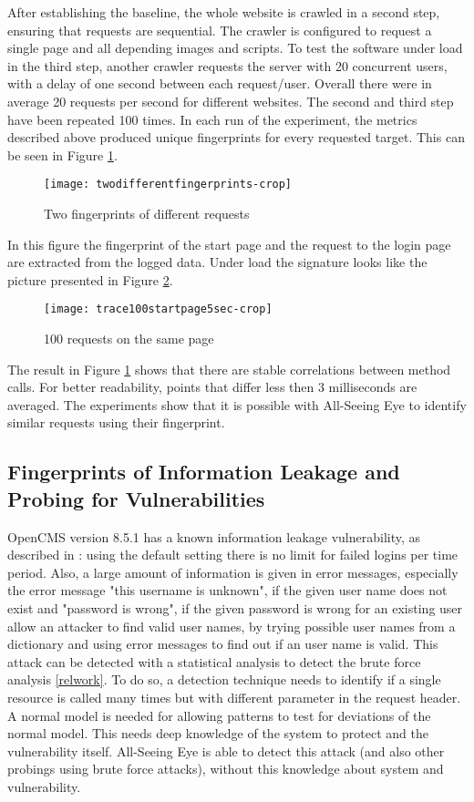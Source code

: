 \documentclass[conference]{IEEEtran}
\begin{document}
After establishing the baseline, the whole website is crawled in a second step, ensuring that requests are sequential. The crawler is configured to request a single page and all depending images and scripts. To test the software under load in the third step, another crawler requests the server with 20 concurrent users, with a delay of one second between each request/user. Overall there were in average 20 requests per second for different websites. The second and third step have been repeated 100 times. In each run of the experiment, the metrics described above produced unique fingerprints for every requested target. This can be seen in Figure \ref{figure:twodifferentprints}.
\begin{figure}
 \centering
\texttt{[image: twodifferentfingerprints-crop]} 
\caption{Two fingerprints of different requests}\label{figure:twodifferentprints}
\end{figure}
In this figure the fingerprint of the start page and the request to the login page are extracted from the logged data.
Under load the signature looks like the picture presented in Figure \ref{figure:trace100}.
\begin{figure}
 \centering
\texttt{[image: trace100startpage5sec-crop]}
\caption{100 requests on the same page}\label{figure:trace100}
\end{figure}

The result in Figure \ref{figure:twodifferentprints} shows that there are stable correlations between method calls. For better readability, points that differ less then 3 milliseconds are averaged. The experiments show that it is possible with All-Seeing Eye to identify similar requests using their fingerprint.


\subsection{Fingerprints of Information Leakage and Probing for Vulnerabilities}\label{probing}
OpenCMS version 8.5.1 has a known information leakage vulnerability, as described in \cite{owasp_2013}: using the default setting there is no limit for failed logins per time period. Also, a large amount of information is given in error messages, especially the error message "this username is unknown", if the given user name does not exist and "password is wrong", if the given password is wrong for an existing user allow an attacker to find valid user names, by trying possible user names from a dictionary and using error messages to find out if an user name is valid. This attack can be detected with a statistical analysis to detect the brute force analysis \ref{relwork}.
To do so, a detection technique needs to identify if a single resource is called many times but with different parameter in the request header. A normal model is needed for allowing patterns to test for deviations of the normal model. This needs deep knowledge of the system to protect and the vulnerability itself. All-Seeing Eye is able to detect this attack (and also other probings using brute force attacks), without this knowledge about system and vulnerability.
\end{document}

